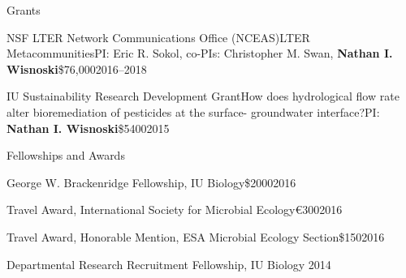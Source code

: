 \documentclass{resume} %
\begin{document}
\begin{rSection}{Grants}

\begin{Grant}{NSF LTER Network Communications Office (NCEAS)}{LTER Metacommunities}{PI: Eric R. Sokol, co-PIs: Christopher M. Swan, {\bf Nathan I. Wisnoski}}{\$76,000}{2016--2018}
\end{Grant}

\begin{Grant}{IU Sustainability Research Development Grant}{How does hydrological flow rate alter bioremediation of pesticides at the surface- groundwater interface?}{PI: {\bf Nathan I. Wisnoski}}{\$5400}{2015}
\end{Grant}

\end{rSection}



\begin{rSection}{Fellowships and Awards}

\begin{Award}{George W. Brackenridge Fellowship, IU Biology}{\$2000}{2016}
\end{Award}

\begin{Award}{Travel Award, International Society for Microbial Ecology}{\euro{}300}{2016}
\end{Award}

\begin{Award}{Travel Award, Honorable Mention, ESA Microbial Ecology Section}{\$150}{2016}
\end{Award}

\begin{Award}{Departmental Research Recruitment Fellowship, IU Biology}{ }{2014}
\end{Award}

\end{rSection}


\end{document}
